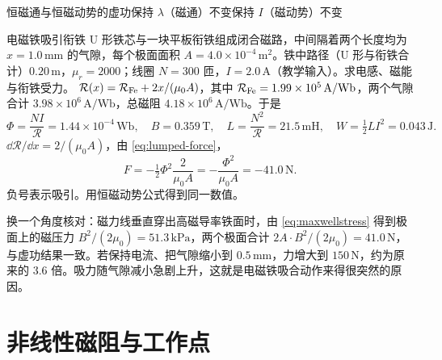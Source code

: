 \begin{compare}{恒磁通与恒磁动势的虚功}{保持 $\lambda$（磁通）不变}{保持 $I$（磁动势）不变}
\end{compare}

\begin{example}[label=ex:lumped-armature]{电磁铁吸引衔铁}
U 形铁芯与一块平板衔铁组成闭合磁路，中间隔着两个长度均为 $x=1.0\,\mathrm{mm}$ 的气隙，每个极面面积 $A=4.0\times10^{-4}\,\mathrm{m^2}$。铁中路径（U 形与衔铁合计）$0.20\,\mathrm m$，$\mu_r=2000$；线圈 $N=300$ 匝，$I=2.0\,\mathrm A$（教学输入）。求电感、磁能与衔铁受力。
\solution
$\mathcal R(x)=\mathcal R_{\rm Fe}+2x/(\mu_0A)$，其中 $\mathcal R_{\rm Fe}=1.99\times10^5\,\mathrm{A/Wb}$，两个气隙合计 $3.98\times10^6\,\mathrm{A/Wb}$，总磁阻 $4.18\times10^6\,\mathrm{A/Wb}$。于是
\begin{equation*}
\Phi=\frac{NI}{\mathcal R}=1.44\times10^{-4}\,\mathrm{Wb},\quad B=0.359\,\mathrm T,\quad L=\frac{N^2}{\mathcal R}=21.5\,\mathrm{mH},\quad W=\tfrac12LI^2=0.043\,\mathrm J .
\end{equation*}
$\dd\mathcal R/\dd x=2/(\mu_0A)$，由 \eqref{eq:lumped-force}，
\begin{equation*}
F=-\tfrac12\Phi^2\frac{2}{\mu_0A}=-\frac{\Phi^2}{\mu_0A}=-41.0\,\mathrm N .
\end{equation*}
负号表示吸引。用恒磁动势公式得到同一数值。

换一个角度核对：磁力线垂直穿出高磁导率铁面时，由 \eqref{eq:maxwellstress} 得到极面上的磁压力 $B^2/(2\mu_0)=51.3\,\mathrm{kPa}$，两个极面合计 $2A\cdot B^2/(2\mu_0)=41.0\,\mathrm N$，与虚功结果一致。若保持电流、把气隙缩小到 $0.5\,\mathrm{mm}$，力增大到 $150\,\mathrm N$，约为原来的 $3.6$ 倍。吸力随气隙减小急剧上升，这就是电磁铁吸合动作来得很突然的原因。
\end{example}

\section{非线性磁阻与工作点}\label{sec:lumped-nonlinear}

